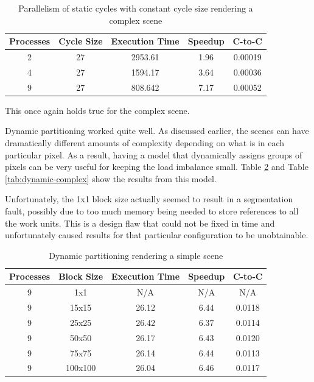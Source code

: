 \documentclass[CMPE]{KGCOEReport}
\begin{document}
\begin{table}[H]
\centering
\caption{Parallelism of static cycles with constant cycle size rendering a complex scene}
\label{tab:static-cycles-complex-2}
\begin{tabular}{ccccc}
\hline
\multicolumn{1}{l}{Processes} & \multicolumn{1}{l}{Cycle Size} & \multicolumn{1}{l}{Execution Time} & Speedup & C-to-C \\ \hline
2 & 27 & 2953.61 & 1.96 & 0.00019 \\
4 & 27 & 1594.17 & 3.64 & 0.00036 \\
9 & 27 & 808.642 & 7.17 & 0.00052
\end{tabular}
\end{table}

This once again holds true for the complex scene.

Dynamic partitioning worked quite well. As discussed earlier, the scenes can 
have dramatically different amounts of complexity depending on what is in 
each particular pixel. As a result, having a model that dynamically assigns 
groups of pixels can be very useful for keeping the load imbalance small. 
Table \ref{tab:dynamic-simple} and Table \ref{tab:dynamic-complex} show the 
results from this model.

Unfortunately, the 1x1 block size actually seemed to result in a segmentation 
fault, possibly due to too much memory being needed to store references to 
all the work units. This is a design flaw that could not be fixed in time and 
unfortunately caused results for that particular configuration to be unobtainable.

\vspace*{1mm}

\begin{table}[h]
\centering
\caption{Dynamic partitioning rendering a simple scene}
\label{tab:dynamic-simple}
\begin{tabular}{ccccc}
\hline
Processes & Block Size & Execution Time & Speedup & C-to-C \\ \hline
9 & 1x1     & N/A    & N/A  & N/A \\
9                   & 15x15      & 26.12          & 6.44    & 0.0118 \\
9                   & 25x25      & 26.42          & 6.37    & 0.0114 \\
9                   & 50x50      & 26.17          & 6.43    & 0.0120 \\
9                   & 75x75      & 26.14          & 6.44    & 0.0113 \\
9                   & 100x100    & 26.04          & 6.46    & 0.0117
\end{tabular}
\end{table}
\end{document}
